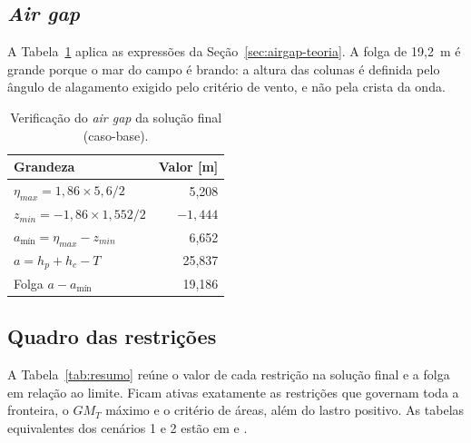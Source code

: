 \documentclass[11pt,a4paper]{article}
\newcommand{\amin}{a_{\text{mín}}}
\begin{document}
\subsection{\emph{Air gap}}

A Tabela~\ref{tab:airgap} aplica as expressões da Seção~\ref{sec:airgap-teoria}. A folga de 19,2~m é
grande porque o mar do campo é brando: a altura das colunas é definida pelo ângulo de alagamento
exigido pelo critério de vento, e não pela crista da onda.

\begin{table}[!htb]
\centering
\caption{Verificação do \emph{air gap} da solução final (caso-base).}\label{tab:airgap}
\begin{tabular}{lr}
\toprule
Grandeza & Valor [m] \\
\midrule
$\eta_{max} = 1{,}86 \times 5{,}6/2$ & 5,208 \\
$z_{min} = -1{,}86 \times 1{,}552/2$ & $-1{,}444$ \\
$\amin = \eta_{max} - z_{min}$ & 6,652 \\
$a = h_p + h_c - T$ & 25,837 \\
Folga $a - \amin$ & 19,186 \\
\bottomrule
\end{tabular}
\end{table}

\subsection{Quadro das restrições}

A Tabela~\ref{tab:resumo} reúne o valor de cada restrição na solução final e a folga em relação ao
limite. Ficam ativas exatamente as restrições que governam toda a fronteira, o $GM_T$ máximo e o
critério de áreas, além do lastro positivo. As tabelas equivalentes dos cenários 1 e 2 estão em
 e .
\end{document}
